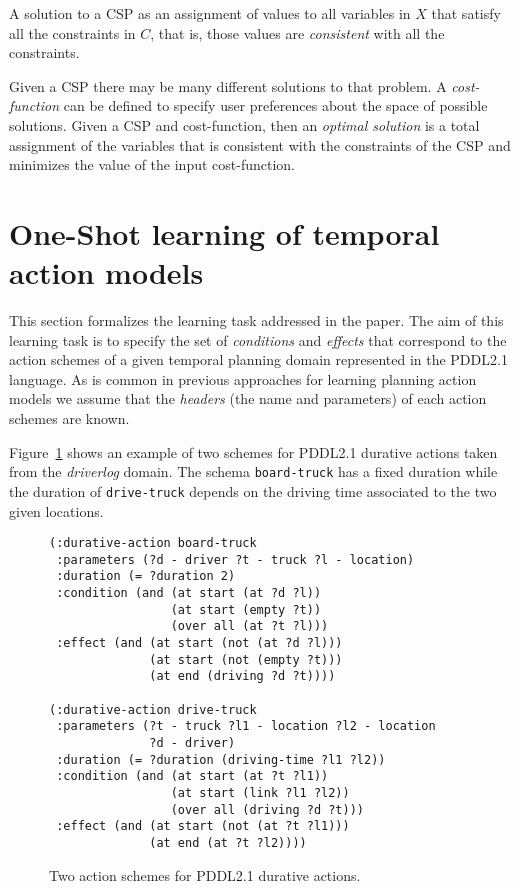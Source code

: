 \documentclass{ecai}
\begin{document}
A solution to a CSP as an assignment of values to all variables in $X$ that satisfy all the constraints in $C$, that is, those values are {\em consistent} with all the constraints.

Given a CSP there may be many different solutions to that problem. A {\em cost-function} can be defined to specify user preferences about the space of possible solutions. Given a CSP and cost-function, then an {\em optimal solution} is a total assignment of the variables that is consistent with the constraints of the CSP and minimizes the value of the input cost-function.




\section{One-Shot learning of temporal action models}
\label{section:learningTemporalModels}

This section formalizes the learning task addressed in the paper. The aim of this learning task is to specify the set of {\em conditions} and {\em effects} that correspond to the action schemes of a given temporal planning domain represented in the PDDL2.1 language. As is common in previous approaches for learning planning action models we assume that the {\em headers} (the name and parameters) of each action schemes are known. 

Figure~\ref{fig:exampleactions2} shows an example of two schemes for PDDL2.1 durative actions taken from the {\em driverlog} domain. The schema \texttt{board-truck} has a fixed duration while the duration of \texttt{drive-truck} depends on the driving time associated to the two given locations.

\begin{figure}
\begin{scriptsize}    
\begin{verbatim}
(:durative-action board-truck
 :parameters (?d - driver ?t - truck ?l - location)
 :duration (= ?duration 2)
 :condition (and (at start (at ?d ?l)) 
                 (at start (empty ?t))
                 (over all (at ?t ?l)))
 :effect (and (at start (not (at ?d ?l))) 
              (at start (not (empty ?t)))
              (at end (driving ?d ?t))))

(:durative-action drive-truck
 :parameters (?t - truck ?l1 - location ?l2 - location 
              ?d - driver)
 :duration (= ?duration (driving-time ?l1 ?l2))
 :condition (and (at start (at ?t ?l1)) 
                 (at start (link ?l1 ?l2))
                 (over all (driving ?d ?t)))
 :effect (and (at start (not (at ?t ?l1))) 
              (at end (at ?t ?l2))))
\end{verbatim}
\end{scriptsize}    
\caption{Two action schemes for PDDL2.1 durative actions.}
\label{fig:exampleactions2}
\end{figure}
\end{document}
